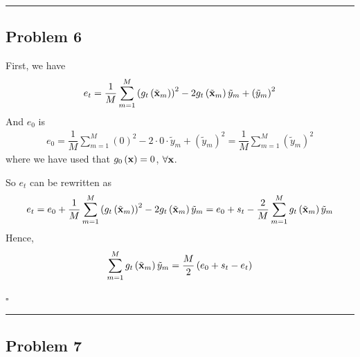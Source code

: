 \documentclass[12pt]{article}
\newcommand*{\QEDB}{\hfill\ensuremath{\square}}
\newcommand{\ParTh}[1]{\left(#1\right)}
\newcommand{\BF}[1]{{\bf#1}}
\newcommand{\horrule}[1]{\rule{\linewidth}{#1}}
\begin{document}
\horrule{0.5pt}

\subsection*{Problem 6}

First, we have
\begin{align}
e_t=\dfrac{1}{M}\sum_{m=1}^{M}\ParTh{g_t\ParTh{\tilde{\BF{x}}_m}}^2-2g_t\ParTh{\tilde{\BF{x}}_m}\tilde{y}_m+\ParTh{\tilde{y}_m}^2
\end{align}
And $e_0$ is
\begin{align}
e_0=\dfrac{1}{M}\sum_{m=1}^{M}\ParTh{0}^2-2\cdot0\cdot\tilde{y}_m+\ParTh{\tilde{y}_m}^2=\dfrac{1}{M}\sum_{m=1}^{M}\ParTh{\tilde{y}_m}^2
\end{align}
where we have used that $g_0\ParTh{\BF{x}}=0$, $\forall\BF{x}$.

So $e_t$ can be rewritten as
\begin{align}
e_t=e_0+\dfrac{1}{M}\sum_{m=1}^{M}\ParTh{g_t\ParTh{\tilde{\BF{x}}_m}}^2-2g_t\ParTh{\tilde{\BF{x}}_m}\tilde{y}_m=e_0+s_t-\dfrac{2}{M}\sum_{m=1}^{M}g_t\ParTh{\tilde{\BF{x}}_m}\tilde{y}_m
\end{align}
Hence,
\begin{align}
\sum_{m=1}^{M}g_t\ParTh{\tilde{\BF{x}}_m}\tilde{y}_m=\dfrac{M}{2}\ParTh{e_0+s_t-e_t}
\end{align}

\QEDB

\horrule{0.5pt}

\subsection*{Problem 7}
\end{document}
